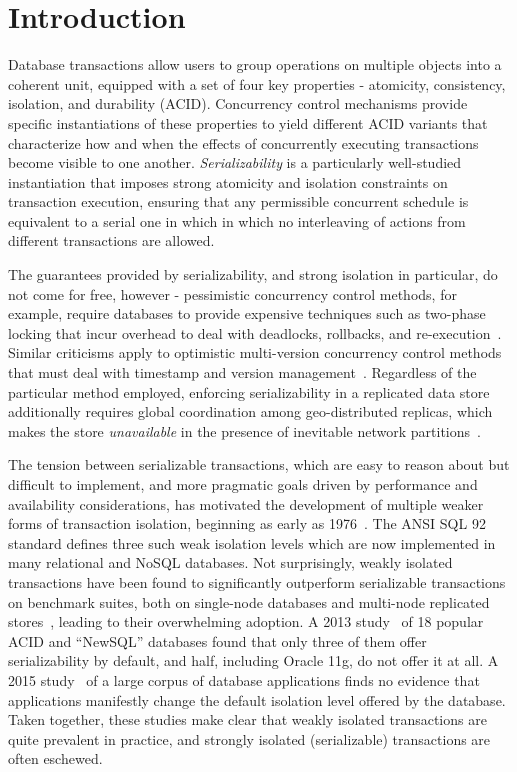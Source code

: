 
\section{Introduction}

Database transactions allow users to group operations on multiple
objects into a coherent unit, equipped with a set of four key
properties - atomicity, consistency, isolation, and durability (ACID).
Concurrency control mechanisms provide specific instantiations of
these properties to yield different ACID variants that characterize
how and when the effects of concurrently executing transactions become
visible to one another.  \emph{Serializability} is a particularly
well-studied instantiation that imposes strong atomicity and isolation
constraints on transaction execution, ensuring that any permissible
concurrent schedule is equivalent to a serial one in which in which no
interleaving of actions from different transactions are allowed.

The guarantees provided by serializability, and strong isolation in
particular, do not come for free, however - pessimistic concurrency
control methods, for example, require databases to provide expensive
techniques such as two-phase locking that incur overhead to deal with
deadlocks, rollbacks, and re-execution~\cite{twopl,ullmanbook}.
Similar criticisms apply to optimistic multi-version concurrency
control methods that must deal with timestamp and version
management~\cite{BG81}.  Regardless of the particular method employed,
enforcing serializability in a replicated data store additionally
requires global coordination among geo-distributed replicas, which
makes the store \emph{unavailable} in the presence of inevitable
network partitions~\cite{cap,sernotavlbl,bailishat,bernsigmod13}.

The tension between serializable transactions, which are easy to
reason about but difficult to implement, and more pragmatic goals
driven by performance and availability considerations, has motivated
the development of multiple weaker forms of transaction isolation,
beginning as early as 1976~\cite{gray1976}. The ANSI SQL 92 standard
defines three such weak isolation levels which are now
implemented in many relational and NoSQL databases. Not surprisingly,
weakly isolated transactions have been found to significantly
outperform serializable transactions on benchmark suites, both on
single-node databases and multi-node replicated
stores~\cite{dbtuningbook,bailishat,bailisvldb}, leading to their
overwhelming adoption. A 2013 study~\cite{bailishotos} of 18 popular
ACID and ``NewSQL'' databases found that only three of them offer
serializability by default, and half, including Oracle 11g, do not
offer it at all.  A 2015 study~\cite{bailisferal} of a large corpus of
database applications finds no evidence that applications manifestly
change the default isolation level offered by the database. Taken
together, these studies make clear that weakly isolated transactions
are quite prevalent in practice, and strongly isolated (serializable)
transactions are often eschewed.

